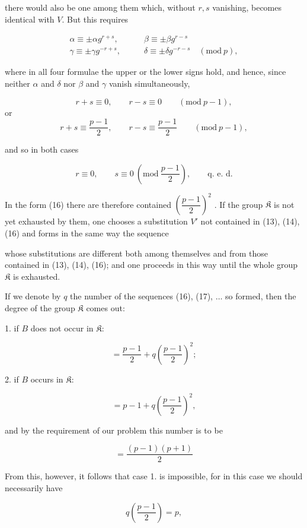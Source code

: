 
there would also be one among them which, without $r, s$ vanishing, becomes identical with $V$. But this requires

\begin{align*}
\alpha\equiv\pm\alpha g^{r+s}, &\qquad \beta\equiv\pm\beta g^{r-s}\\
\gamma\equiv\pm\gamma g^{-r+s}, &\qquad \delta\equiv\pm\delta g^{-r-s}\quad(\mathrm{mod}\ p),
\end{align*}

where in all four formulae the upper or the lower signs hold, and hence, since neither $\alpha$ and $\delta$ nor $\beta$ and $\gamma$ vanish simultaneously,

\[ r+s\equiv 0,\qquad r-s\equiv 0\qquad(\mathrm{mod}\ p-1), \]
or
\[ r+s\equiv\frac{p-1}{2},\qquad r-s\equiv\frac{p-1}{2}\qquad(\mathrm{mod}\ p-1), \]

and so in both cases

\[ r\equiv 0,\qquad s\equiv 0\ \left(\mathrm{mod}\ \frac{p-1}{2}\right),\qquad\text{q. e. d.} \]

In the form (16) there are therefore contained $\left(\dfrac{p-1}{2}\right)^2$ . If the group $\mathfrak{K}$ is not yet exhausted by them, one chooses a substitution $V'$ not contained in (13), (14), (16) and forms in the same way the sequence


whose substitutions are different both among themselves and from those contained in (13), (14), (16); and one proceeds in this way until the whole group $\mathfrak{K}$ is exhausted.

If we denote by $q$ the number of the sequences (16), (17), $\dots$ so formed, then the degree of the group $\mathfrak{K}$ comes out:

1. if $B$ does not occur in $\mathfrak{K}$:

\[ =\frac{p-1}{2}+q\left(\frac{p-1}{2}\right)^2; \]

2. if $B$ occurs in $\mathfrak{K}$:

\[ =p-1+q\left(\frac{p-1}{2}\right)^2, \]

and by the requirement of our problem this number is to be

\[ =\frac{(p-1)(p+1)}{2} \]

From this, however, it follows that case 1. is impossible, for in this case we should necessarily have

\[ q\left(\frac{p-1}{2}\right)=p, \]
